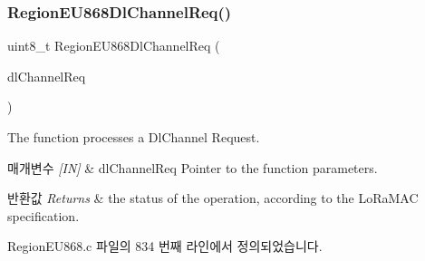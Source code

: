 \subsubsection{\texorpdfstring{Region\+E\+U868\+Dl\+Channel\+Req()}{RegionEU868DlChannelReq()}}
{\footnotesize\ttfamily uint8\+\_\+t Region\+E\+U868\+Dl\+Channel\+Req (\begin{DoxyParamCaption}\item[{\mbox{\hyperlink{group___r_e_g_i_o_n_gae0d608ff1f8ea0a430e4f9a4c38ec7f3}{Dl\+Channel\+Req\+Params\+\_\+t}} $\ast$}]{dl\+Channel\+Req }\end{DoxyParamCaption})}



The function processes a Dl\+Channel Request. 


\begin{DoxyParams}{매개변수}
{\em \mbox{[}\+I\+N\mbox{]}} & dl\+Channel\+Req Pointer to the function parameters.\\
\hline
\end{DoxyParams}

\begin{DoxyRetVals}{반환값}
{\em Returns} & the status of the operation, according to the Lo\+Ra\+M\+AC specification. \\
\hline
\end{DoxyRetVals}


Region\+E\+U868.\+c 파일의 834 번째 라인에서 정의되었습니다.


